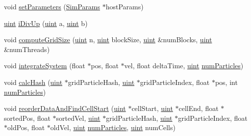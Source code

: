 \begin{DoxyCompactItemize}
void \hyperlink{particle_system__cuda_8cu_a342176dbaba2668312c45e1a1423fc4e}{set\-Parameters} (\hyperlink{struct_sim_params}{Sim\-Params} $\ast$host\-Params)
\item 
\hyperlink{particles__kernel_8cuh_a91ad9478d81a7aaf2593e8d9c3d06a14}{uint} \hyperlink{particle_system__cuda_8cu_aa5accec7fb28381615c8cb68522c9eb3}{i\-Div\-Up} (\hyperlink{particles__kernel_8cuh_a91ad9478d81a7aaf2593e8d9c3d06a14}{uint} a, \hyperlink{particles__kernel_8cuh_a91ad9478d81a7aaf2593e8d9c3d06a14}{uint} b)
\item 
void \hyperlink{particle_system__cuda_8cu_a78e8aa50e0629b57cff219a2fa753ed0}{compute\-Grid\-Size} (\hyperlink{particles__kernel_8cuh_a91ad9478d81a7aaf2593e8d9c3d06a14}{uint} n, \hyperlink{particles__kernel_8cuh_a91ad9478d81a7aaf2593e8d9c3d06a14}{uint} block\-Size, \hyperlink{particles__kernel_8cuh_a91ad9478d81a7aaf2593e8d9c3d06a14}{uint} \&num\-Blocks, \hyperlink{particles__kernel_8cuh_a91ad9478d81a7aaf2593e8d9c3d06a14}{uint} \&num\-Threads)
\item 
void \hyperlink{particle_system__cuda_8cu_a34e9db8b801cd537e5ae5a4a886e020c}{integrate\-System} (float $\ast$pos, float $\ast$vel, float delta\-Time, \hyperlink{particles__kernel_8cuh_a91ad9478d81a7aaf2593e8d9c3d06a14}{uint} \hyperlink{particles_8cpp_a05b8a90212054a3eb1a036ae0c269596}{num\-Particles})
\item 
void \hyperlink{particle_system__cuda_8cu_ae0a4037d25e768622443077546399cf2}{calc\-Hash} (\hyperlink{particles__kernel_8cuh_a91ad9478d81a7aaf2593e8d9c3d06a14}{uint} $\ast$grid\-Particle\-Hash, \hyperlink{particles__kernel_8cuh_a91ad9478d81a7aaf2593e8d9c3d06a14}{uint} $\ast$grid\-Particle\-Index, float $\ast$pos, int \hyperlink{particles_8cpp_a05b8a90212054a3eb1a036ae0c269596}{num\-Particles})
\item 
void \hyperlink{particle_system__cuda_8cu_ac72ccd068434c46c2f901c751d53be1d}{reorder\-Data\-And\-Find\-Cell\-Start} (\hyperlink{particles__kernel_8cuh_a91ad9478d81a7aaf2593e8d9c3d06a14}{uint} $\ast$cell\-Start, \hyperlink{particles__kernel_8cuh_a91ad9478d81a7aaf2593e8d9c3d06a14}{uint} $\ast$cell\-End, float $\ast$sorted\-Pos, float $\ast$sorted\-Vel, \hyperlink{particles__kernel_8cuh_a91ad9478d81a7aaf2593e8d9c3d06a14}{uint} $\ast$grid\-Particle\-Hash, \hyperlink{particles__kernel_8cuh_a91ad9478d81a7aaf2593e8d9c3d06a14}{uint} $\ast$grid\-Particle\-Index, float $\ast$old\-Pos, float $\ast$old\-Vel, \hyperlink{particles__kernel_8cuh_a91ad9478d81a7aaf2593e8d9c3d06a14}{uint} \hyperlink{particles_8cpp_a05b8a90212054a3eb1a036ae0c269596}{num\-Particles}, \hyperlink{particles__kernel_8cuh_a91ad9478d81a7aaf2593e8d9c3d06a14}{uint} num\-Cells)

\end{DoxyCompactItemize}
